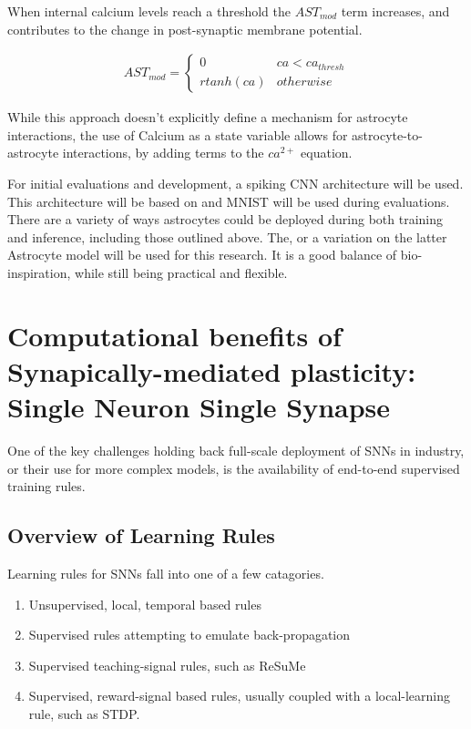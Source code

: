     
    When internal calcium levels reach a threshold the $AST_{mod}$ term
    increases, and contributes to the change in post-synaptic membrane
    potential.
    
    \begin{align}
        AST_{mod} =
        \begin{cases} 
            0 & ca < ca_{thresh} \\ r tanh(ca) & otherwise
        \end{cases}
    \end{align}
    
    While this approach doesn't explicitly define a mechanism for astrocyte
    interactions, the use of Calcium as a state variable allows for
    astrocyte-to-astrocyte interactions, by adding terms to the $ca^{2+}$
    equation.
    
    For initial evaluations and development, a spiking CNN architecture will be
    used. This architecture will be based on \cite{rstdp_mnist} and MNIST will
    be used during evaluations. There are a variety of ways astrocytes could be
    deployed during both training and inference, including those outlined
    above. The, or a variation on the latter Astrocyte model will be used for
    this research. It is a good balance of bio-inspiration, while still being
    practical and flexible.
    
    
    \section{Computational benefits of Synapically-mediated plasticity: Single Neuron Single Synapse}
    One of the key challenges holding back full-scale deployment of SNNs in
    industry, or their use for more complex models, is the availability of
    end-to-end supervised training rules.
    
    \subsection{Overview of Learning Rules}
    Learning rules for SNNs fall into one of a few catagories.
    \begin{enumerate}
        \item Unsupervised, local, temporal based rules
        \item Supervised rules attempting to emulate back-propagation
        \item Supervised teaching-signal rules, such as ReSuMe
        \item Supervised, reward-signal based rules, usually coupled with a
          local-learning rule, such as STDP.
    \end{enumerate}
    
